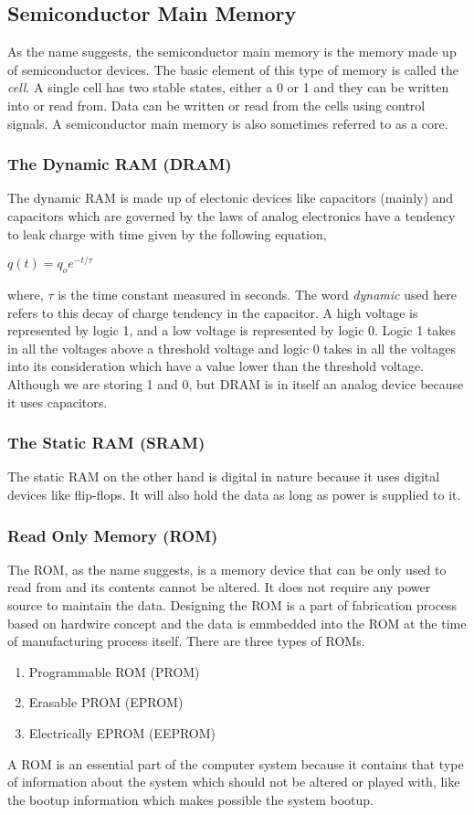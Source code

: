 \documentclass{article}
\begin{document}
\subsection{Semiconductor Main Memory}
As the name suggests, the semiconductor main memory is the memory made up of semiconductor devices. The basic element of this type of memory is called the \textit{cell}. A single cell has two stable states, either a 0 or 1 and they can be written into or read from. Data can be written or read from the cells using control signals. A semiconductor main memory is also sometimes referred to as a core.

\newpage
\subsubsection{The Dynamic RAM (DRAM)}
The dynamic RAM is made up of electonic devices like capacitors (mainly) and capacitors which are governed by the laws of analog electronics have a tendency to leak charge with time given by the following equation,
\begin{center}
$\displaystyle q(t) = q_{o}e^{-t/\tau}$
\end{center}
where, $\tau$ is the time constant measured in seconds. The word \textit{dynamic} used here refers to this decay of charge tendency in the capacitor. A high voltage is represented by logic 1, and a low voltage is represented by logic 0. Logic 1 takes in all the voltages above a threshold voltage and logic 0 takes in all the voltages into its consideration which have a value lower than the threshold voltage. Although we are storing 1 and 0, but DRAM is in itself an analog device because it uses capacitors.

\subsubsection{The Static RAM (SRAM)}
The static RAM on the other hand is digital in nature because it uses digital devices like flip-flops. It will also hold the data as long as power is supplied to it.

\subsubsection{Read Only Memory (ROM)}
The ROM, as the name suggests, is a memory device that can be only used to read from and its contents cannot be altered. It does not require any power source to maintain the data. Designing the ROM is a part of fabrication process based on hardwire concept and the data is emmbedded into the ROM at the time of manufacturing process itself. There are three types of ROMs.
\begin{enumerate}
\item Programmable ROM (PROM)
\item Erasable PROM (EPROM)
\item Electrically EPROM (EEPROM)
\end{enumerate}
A ROM is an essential part of the computer system because it contains that type of information about the system which should not be altered or played with, like the bootup information which makes possible the system bootup.
\end{document}
